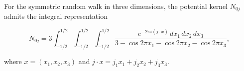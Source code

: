 For the symmetric random walk in three dimensions, the potential kernel $N_{0j}$ admits the integral representation

$$N_{0j} = 3 \int_{-1/2}^{1/2} \int_{-1/2}^{1/2} \int_{-1/2}^{1/2} \frac{e^{-2\pi i(j \cdot x)} \, dx_1 \, dx_2 \, dx_3}{3 - \cos 2\pi x_1 - \cos 2\pi x_2 - \cos 2\pi x_3},$$

where $x = (x_1, x_2, x_3)$ and $j \cdot x = j_1 x_1 + j_2 x_2 + j_3 x_3$.
